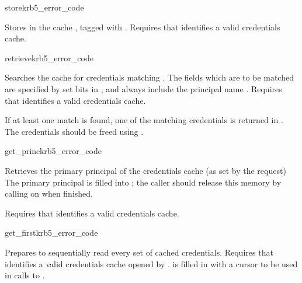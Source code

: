 \begin{funcdecl}{store}{krb5_error_code}{\funcin}
\end{funcdecl}

Stores  in the cache , tagged with
.
Requires that  identifies a valid credentials cache.


\begin{funcdecl}{retrieve}{krb5_error_code}{\funcin}
\funcout
{}
\end{funcdecl}

Searches the cache  for credentials matching
.  The fields which are to be matched are specified by
set bits in , and always include the principal
name .
Requires that  identifies a valid credentials cache.

If at least one match is found, one of the matching credentials is
returned in . The credentials should be freed using
.


\begin{funcdecl}{get_princ}{krb5_error_code}{\funcin}
\end{funcdecl}

Retrieves the primary principal of the credentials cache (as
set by the  request)
The primary principal is filled into ; the caller
should release this memory by calling  on
 when finished.

Requires that  identifies a valid credentials cache.

\begin{funcdecl}{get_first}{krb5_error_code}{\funcin}
\funcout
{}
\end{funcdecl}

Prepares to sequentially read every set of cached credentials.
Requires that  identifies a valid credentials cache opened by
.
 is filled in with a cursor to be used in calls to
.

